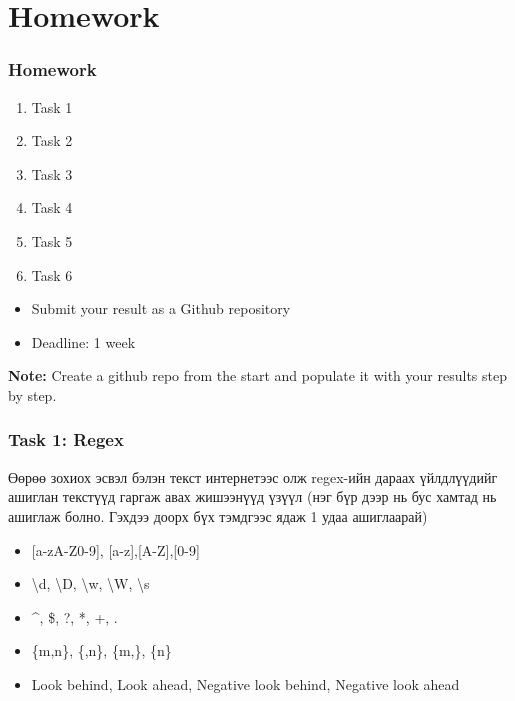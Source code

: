 \documentclass{beamer}
\begin{document}
\section{Homework} 

\begin{frame}
    \frametitle{Homework}
    \begin{enumerate}
        \item Task 1
        \item Task 2
        \item Task 3
        \item Task 4
        \item Task 5
        \item Task 6
    \end{enumerate}

    \vskip 2mm
    \begin{itemize}
        \item Submit your result as a Github repository
        \item Deadline: 1 week %
    \end{itemize}

\vfill
\textbf{Note:} Create a github repo from the start and populate it with your results step by step.
\end{frame}

\begin{frame}
    \frametitle{Task 1: Regex}
    Өөрөө зохиох эсвэл бэлэн текст интернетээс олж regex-ийн 
    дараах үйлдлүүдийг ашиглан текстүүд гаргаж авах жишээнүүд үзүүл 
    (нэг бүр дээр нь бус хамтад нь ашиглаж болно. Гэхдээ доорх бүх тэмдгээс ядаж 1 удаа ашиглаарай)

    \begin{itemize}
        \item {[a-zA-Z0-9], [a-z],[A-Z],[0-9]}
        \item \textbackslash d, \textbackslash D, \textbackslash w, \textbackslash W, \textbackslash s
        \item \^{}, \$, ?, *, +, .
        \item \{m,n\}, \{,n\}, \{m,\}, \{n\}
        \item Look behind, Look ahead, Negative look behind, Negative look ahead
    \end{itemize}
\end{frame}
\end{document}
